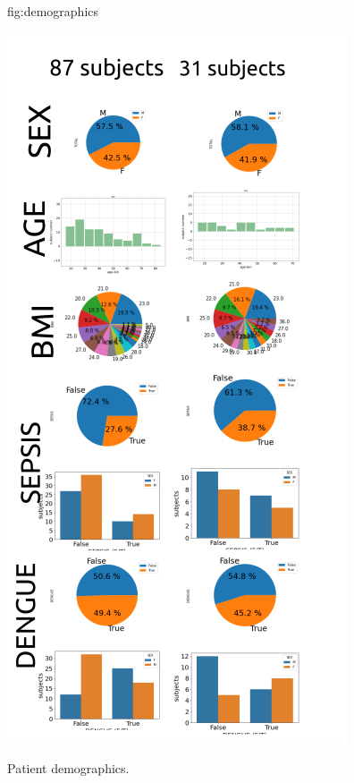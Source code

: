\documentclass[mlabstract,twocolumn]{jmlr}
\begin{document}
\begin{figure}[htbp]
\floatconts
  {fig:demographics}
  {\caption{Patient demographics.}} %
  {\includegraphics[width=\columnwidth]{../figures/patient-demographics-and-diseases/versions/drawing-v01}}%
\end{figure}
\end{document}

